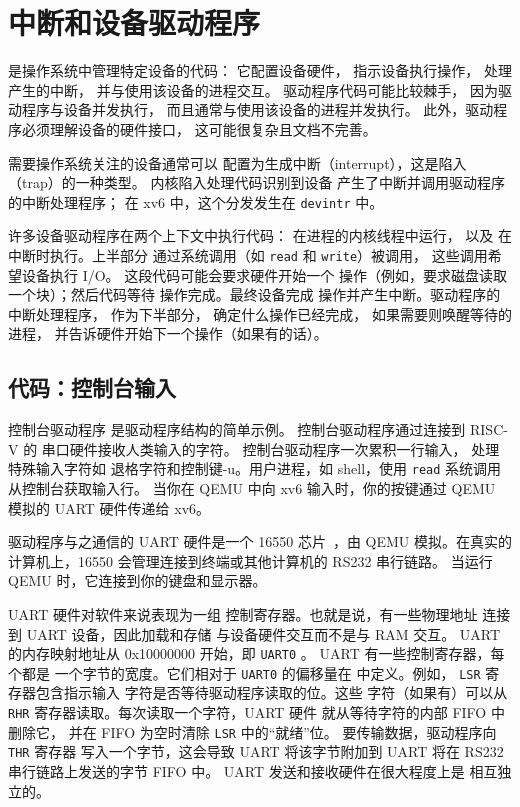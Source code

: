 \chapter{中断和设备驱动程序}
\label{CH:INTERRUPT}

是操作系统中管理特定设备的代码：
它配置设备硬件，
指示设备执行操作，
处理产生的中断，
并与使用该设备的进程交互。
驱动程序代码可能比较棘手，
因为驱动程序与设备并发执行，
而且通常与使用该设备的进程并发执行。
此外，驱动程序必须理解设备的硬件接口，
这可能很复杂且文档不完善。

需要操作系统关注的设备通常可以
配置为生成中断（interrupt），这是陷入（trap）的一种类型。
内核陷入处理代码识别到设备
产生了中断并调用驱动程序的中断处理程序；
在 xv6 中，这个分发发生在 {\tt devintr}  中。

许多设备驱动程序在两个上下文中执行代码：
在进程的内核线程中运行，
以及 
在中断时执行。上半部分
通过系统调用（如 {\tt read} 和 {\tt write}）被调用，
这些调用希望设备执行 I/O。
这段代码可能会要求硬件开始一个
操作（例如，要求磁盘读取一个块）；然后代码等待
操作完成。最终设备完成
操作并产生中断。驱动程序的中断处理程序，
作为下半部分，
确定什么操作已经完成，
如果需要则唤醒等待的进程，
并告诉硬件开始下一个操作（如果有的话）。

\section{代码：控制台输入}

控制台驱动程序 
是驱动程序结构的简单示例。
控制台驱动程序通过连接到 RISC-V 的 
串口硬件接收人类输入的字符。
控制台驱动程序一次累积一行输入，
处理特殊输入字符如
退格字符和控制键-u。用户进程，如 shell，使用
{\tt read} 系统调用从控制台获取输入行。
当你在 QEMU 中向 xv6 输入时，你的按键通过
QEMU 模拟的 UART 硬件传递给 xv6。

驱动程序与之通信的 UART 硬件是一个 16550
芯片~\cite{ns16550a}，由 QEMU 模拟。在真实的计算机上，16550
会管理连接到终端或其他计算机的 RS232 串行链路。
当运行 QEMU 时，它连接到你的键盘和显示器。

UART 硬件对软件来说表现为一组 
控制寄存器。也就是说，有一些物理地址
连接到 UART 设备，因此加载和存储
与设备硬件交互而不是与 RAM 交互。
UART 的内存映射地址从 0x10000000 开始，即 {\tt UART0}
。
UART 有一些控制寄存器，每个都是
一个字节的宽度。它们相对于 {\tt UART0} 的偏移量在
 中定义。例如，
{\tt LSR} 寄存器包含指示输入
字符是否等待驱动程序读取的位。这些
字符（如果有）可以从
{\tt RHR} 寄存器读取。每次读取一个字符，UART 硬件
就从等待字符的内部 FIFO 中删除它，
并在 FIFO 为空时清除 {\tt LSR} 中的``就绪''位。
要传输数据，驱动程序向 {\tt THR} 寄存器
写入一个字节，这会导致 UART 将该字节附加到
UART 将在 RS232 串行链路上发送的字节 FIFO 中。
UART 发送和接收硬件在很大程度上是
相互独立的。

